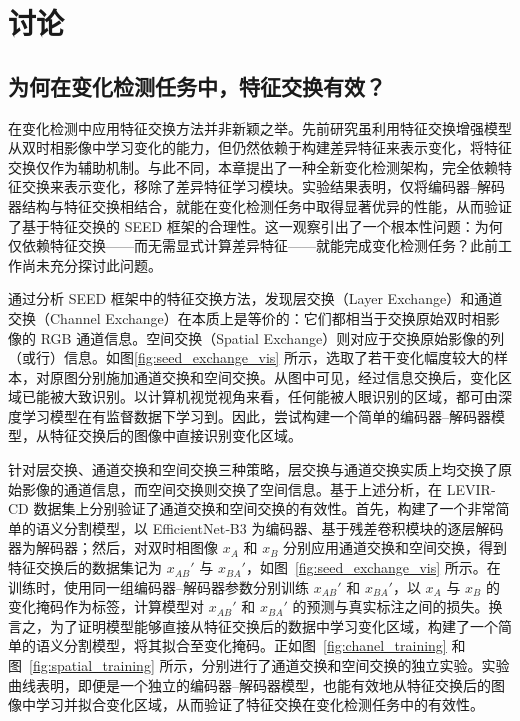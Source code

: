 \section{讨论}
\subsection{为何在变化检测任务中，特征交换有效？}
在变化检测中应用特征交换方法并非新颖之举。先前研究虽利用特征交换增强模型从双时相影像中学习变化的能力，但仍然依赖于构建差异特征来表示变化，将特征交换仅作为辅助机制。与此不同，本章提出了一种全新变化检测架构，完全依赖特征交换来表示变化，移除了差异特征学习模块。实验结果表明，仅将编码器–解码器结构与特征交换相结合，就能在变化检测任务中取得显著优异的性能，从而验证了基于特征交换的 SEED 框架的合理性。这一观察引出了一个根本性问题：为何仅依赖特征交换——而无需显式计算差异特征——就能完成变化检测任务？此前工作尚未充分探讨此问题。

通过分析 SEED 框架中的特征交换方法，发现层交换（Layer Exchange）和通道交换（Channel Exchange）在本质上是等价的：它们都相当于交换原始双时相影像的 RGB 通道信息。空间交换（Spatial Exchange）则对应于交换原始影像的列（或行）信息。如图\ref{fig:seed_exchange_vis} 所示，选取了若干变化幅度较大的样本，对原图分别施加通道交换和空间交换。从图中可见，经过信息交换后，变化区域已能被大致识别。以计算机视觉视角来看，任何能被人眼识别的区域，都可由深度学习模型在有监督数据下学习到。因此，尝试构建一个简单的编码器–解码器模型，从特征交换后的图像中直接识别变化区域。

针对层交换、通道交换和空间交换三种策略，层交换与通道交换实质上均交换了原始影像的通道信息，而空间交换则交换了空间信息。基于上述分析，在 LEVIR‐CD 数据集上分别验证了通道交换和空间交换的有效性。首先，构建了一个非常简单的语义分割模型，以 EfficientNet‐B3 为编码器、基于残差卷积模块的逐层解码器为解码器；然后，对双时相图像 \(x_A\) 和 \(x_B\) 分别应用通道交换和空间交换，得到特征交换后的数据集记为 \(x_{AB}'\) 与 \(x_{BA}'\)，如图~\ref{fig:seed_exchange_vis} 所示。在训练时，使用同一组编码器–解码器参数分别训练 \(x_{AB}'\) 和 \(x_{BA}'\)，以 \(x_A\) 与 \(x_B\) 的变化掩码作为标签，计算模型对 \(x_{AB}'\) 和 \(x_{BA}'\) 的预测与真实标注之间的损失。换言之，为了证明模型能够直接从特征交换后的数据中学习变化区域，构建了一个简单的语义分割模型，将其拟合至变化掩码。正如图~\ref{fig:chanel_training} 和图~\ref{fig:spatial_training} 所示，分别进行了通道交换和空间交换的独立实验。实验曲线表明，即便是一个独立的编码器–解码器模型，也能有效地从特征交换后的图像中学习并拟合变化区域，从而验证了特征交换在变化检测任务中的有效性。  


